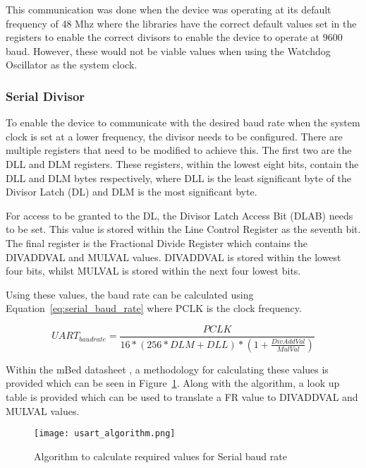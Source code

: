 This communication was done when the device was operating at its default frequency of 48 Mhz where the libraries have the correct default values set in the registers to enable the correct divisors to enable the device to operate at 9600 baud. However, these would not be viable values when using the Watchdog Oscillator as the system clock.

\subsubsection{Serial Divisor}

To enable the device to communicate with the desired baud rate when the system clock is set at a lower frequency, the divisor needs to be configured. There are multiple registers that need to be modified to achieve this. The first two are the DLL and DLM registers. These registers, within the lowest eight bits, contain the DLL and DLM bytes respectively, where DLL is the least significant byte of the Divisor Latch (DL) and DLM is the most significant byte.

For access to be granted to the DL, the Divisor Latch Access Bit (DLAB) needs to be set. This value is stored within the Line Control Register as the seventh bit. The final register is the Fractional Divide Register which contains the DIVADDVAL and MULVAL values. DIVADDVAL is stored within the lowest four bits, whilst MULVAL is stored within the next four lowest bits. 

Using these values, the baud rate can be calculated using Equation~\ref{eq:serial_baud_rate} where PCLK is the clock frequency\cite{mbed_datasheet}.

\begin{equation}
	\label{eq:serial_baud_rate}
	UART_{baud rate} = \frac{PCLK}{16 * (256 * DLM + DLL) * (1 + \frac{DivAddVal}{MulVal})}
\end{equation}

Within the mBed datasheet \cite{mbed_datasheet}, a methodology for calculating these values is provided which can be seen in Figure~\ref{fig:serial_algo}. Along with the algorithm, a look up table is provided which can be used to translate a FR value to DIVADDVAL and MULVAL values. 

\begin{figure}
	\centering
	\texttt{[image: usart\_algorithm.png]}
	\caption{Algorithm to calculate required values for Serial baud rate}
	\label{fig:serial_algo}
\end{figure}

